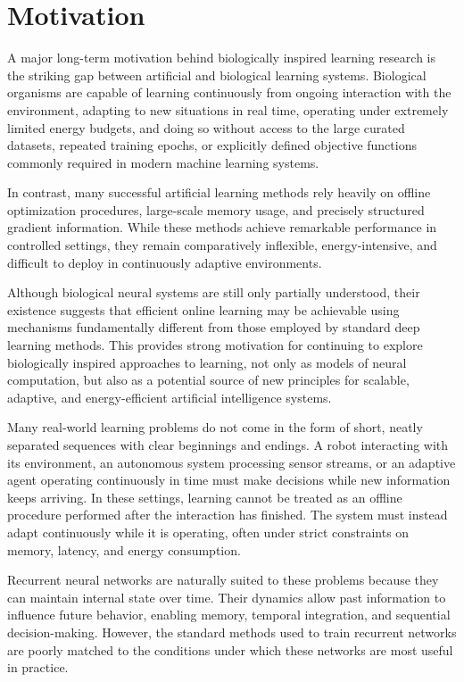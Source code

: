 \section{Motivation}

A major long-term motivation behind biologically inspired learning research is the striking gap between artificial and biological learning systems. Biological organisms are capable of learning continuously from ongoing interaction with the environment, adapting to new situations in real time, operating under extremely limited energy budgets, and doing so without access to the large curated datasets, repeated training epochs, or explicitly defined objective functions commonly required in modern machine learning systems.

In contrast, many successful artificial learning methods rely heavily on offline optimization procedures, large-scale memory usage, and precisely structured gradient information. While these methods achieve remarkable performance in controlled settings, they remain comparatively inflexible, energy-intensive, and difficult to deploy in continuously adaptive environments.

Although biological neural systems are still only partially understood, their existence suggests that efficient online learning may be achievable using mechanisms fundamentally different from those employed by standard deep learning methods. This provides strong motivation for continuing to explore biologically inspired approaches to learning, not only as models of neural computation, but also as a potential source of new principles for scalable, adaptive, and energy-efficient artificial intelligence systems.

Many real-world learning problems do not come in the form of short, neatly separated sequences with clear beginnings and endings. A robot interacting with its environment, an autonomous system processing sensor streams, or an adaptive agent operating continuously in time must make decisions while new information keeps arriving. In these settings, learning cannot be treated as an offline procedure performed after the interaction has finished. The system must instead adapt continuously while it is operating, often under strict constraints on memory, latency, and energy consumption.

Recurrent neural networks are naturally suited to these problems because they can maintain internal state over time. Their dynamics allow past information to influence future behavior, enabling memory, temporal integration, and sequential decision-making. However, the standard methods used to train recurrent networks are poorly matched to the conditions under which these networks are most useful in practice.

